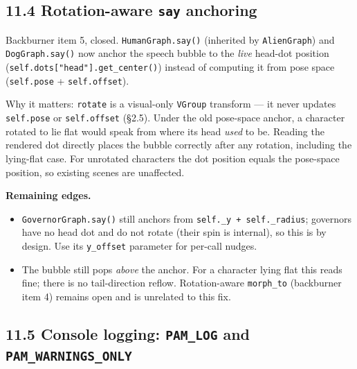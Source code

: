 \documentclass[
  12pt,
  letterpaper,
]{book}
\begin{document}
\subsection{\texorpdfstring{11.4 Rotation-aware \texttt{say}
anchoring}{11.4 Rotation-aware say anchoring}}\label{rotation-aware-say-anchoring}

Backburner item 5, closed. \texttt{HumanGraph.say()} (inherited by
\texttt{AlienGraph}) and \texttt{DogGraph.say()} now anchor the speech
bubble to the \emph{live} head-dot position
(\texttt{self.dots{[}"head"{]}.get\_center()}) instead of computing it
from pose space (\texttt{self.pose} + \texttt{self.offset}).

Why it matters: \texttt{rotate} is a visual-only \texttt{VGroup}
transform --- it never updates \texttt{self.pose} or
\texttt{self.offset} (§2.5). Under the old pose-space anchor, a
character rotated to lie flat would speak from where its head
\emph{used} to be. Reading the rendered dot directly places the bubble
correctly after any rotation, including the lying-flat case. For
unrotated characters the dot position equals the pose-space position,
so existing scenes are unaffected.

\textbf{Remaining edges.}

\begin{itemize}
\item
  \texttt{GovernorGraph.say()} still anchors from
  \texttt{self.\_y\ +\ self.\_radius}; governors have no head dot and
  do not rotate (their spin is internal), so this is by design. Use
  its \texttt{y\_offset} parameter for per-call nudges.
\item
  The bubble still pops \emph{above} the anchor. For a character lying
  flat this reads fine; there is no tail-direction reflow. Rotation-aware
  \texttt{morph\_to} (backburner item 4) remains open and is unrelated
  to this fix.
\end{itemize}

\subsection{\texorpdfstring{11.5 Console logging:
\texttt{PAM\_LOG} and
\texttt{PAM\_WARNINGS\_ONLY}}{11.5 Console logging: PAM\_LOG and PAM\_WARNINGS\_ONLY}}\label{console-logging-pam-log}
\end{document}
